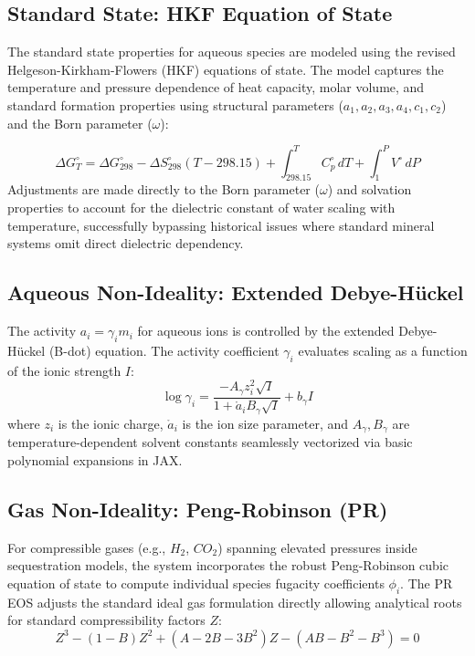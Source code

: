 \documentclass[11pt,a4paper]{article}
\begin{document}
\subsection{Standard State: HKF Equation of State}
The standard state properties for aqueous species are modeled using the revised Helgeson-Kirkham-Flowers (HKF) equations of state. The model captures the temperature and pressure dependence of heat capacity, molar volume, and standard formation properties using structural parameters ($a_1, a_2, a_3, a_4, c_1, c_2$) and the Born parameter ($\omega$):

\begin{equation}
    \Delta G^\circ_T = \Delta G^\circ_{298} - \Delta S^\circ_{298}(T - 298.15) + \int_{298.15}^T C_p^\circ \, dT + \int_{1}^P V^\circ \, dP
\end{equation}
Adjustments are made directly to the Born parameter ($\omega$) and solvation properties to account for the dielectric constant of water scaling with temperature, successfully bypassing historical issues where standard mineral systems omit direct dielectric dependency.

\subsection{Aqueous Non-Ideality: Extended Debye-Hückel}
The activity $a_i = \gamma_i m_i$ for aqueous ions is controlled by the extended Debye-Hückel (B-dot) equation. The activity coefficient $\gamma_i$ evaluates scaling as a function of the ionic strength $I$:
\begin{equation}
    \log \gamma_i = \frac{- A_\gamma z_i^2 \sqrt{I}}{1 + \mathring{a}_i B_\gamma \sqrt{I}} + b_\gamma I
\end{equation}
where $z_i$ is the ionic charge, $\mathring{a}_i$ is the ion size parameter, and $A_\gamma, B_\gamma$ are temperature-dependent solvent constants seamlessly vectorized via basic polynomial expansions in JAX.

\subsection{Gas Non-Ideality: Peng-Robinson (PR)}
For compressible gases (e.g., $H_2$, $CO_2$) spanning elevated pressures inside sequestration models, the system incorporates the robust Peng-Robinson cubic equation of state to compute individual species fugacity coefficients $\phi_i$. The PR EOS adjusts the standard ideal gas formulation directly allowing analytical roots for standard compressibility factors $Z$:
\begin{equation}
    Z^3 - (1-B)Z^2 + (A-2B-3B^2)Z - (AB - B^2 - B^3) = 0
\end{equation}
\end{document}

